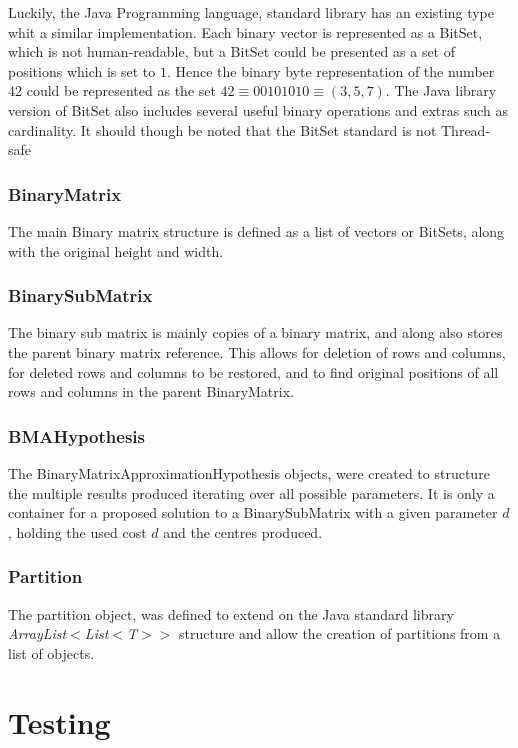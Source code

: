 \documentclass[a4paper]{article}
\begin{document}
Luckily, the Java Programming language, standard library has an existing type whit a similar
implementation. Each binary vector is represented as a BitSet, which is not human-readable, but
a BitSet could be presented as a set of positions which is set to $1$. Hence the binary byte
representation of the number $42$ could be represented as the set
$42 \equiv 00101010 \equiv (3,5,7)$. The Java library version of BitSet also includes several
useful binary operations and extras such as cardinality. It should though be noted that the
BitSet standard is not Thread-safe \cite{bitset_java_17_2021}

\subsubsection{BinaryMatrix}
The main Binary matrix structure is defined as a list of vectors or BitSets, along with the
original height and width.

\subsubsection{BinarySubMatrix}
The binary sub matrix is mainly copies of a binary matrix, and along also stores the parent
binary matrix reference. This allows for deletion of rows and columns, for deleted rows and
columns to be restored, and to find original positions of all rows and columns in the parent
BinaryMatrix.

\subsubsection{BMAHypothesis}
The BinaryMatrixApproximationHypothesis objects, were created to structure the multiple
results produced iterating over all possible parameters. It is only a container for a
proposed solution to a BinarySubMatrix with a given parameter $d$, holding the used cost $d$
and the centres produced.

\subsubsection{Partition}
The partition object, was defined to extend on the Java standard library \textit{ArrayList$<$List$<$T$>>$}
structure and allow the creation of partitions from a list of objects.


%
%
\newpage

\section{Testing}
\label{sec:testing}
\end{document}
